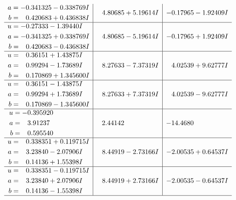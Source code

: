 \documentclass[1p]{elsarticle_modified}
\theoremstyle{definition}
\begin{document}
$$\begin{array}{c|c|c}
\begin{aligned}
a &= -0.341325 - 0.338769 I \\
b &= \phantom{-}0.420683 + 0.436838 I\end{aligned}
 & \phantom{-}4.80685 + 5.19614 I & -0.17965 - 1.92409 I \\ \hline\begin{aligned}
u &= -0.27333 - 1.39440 I \\
a &= -0.341325 + 0.338769 I \\
b &= \phantom{-}0.420683 - 0.436838 I\end{aligned}
 & \phantom{-}4.80685 - 5.19614 I & -0.17965 + 1.92409 I \\ \hline\begin{aligned}
u &= \phantom{-}0.36151 + 1.43875 I \\
a &= \phantom{-}0.99294 - 1.73689 I \\
b &= \phantom{-}0.170869 + 1.345600 I\end{aligned}
 & \phantom{-}8.27633 - 7.37319 I & \phantom{-}4.02539 + 9.62777 I \\ \hline\begin{aligned}
u &= \phantom{-}0.36151 - 1.43875 I \\
a &= \phantom{-}0.99294 + 1.73689 I \\
b &= \phantom{-}0.170869 - 1.345600 I\end{aligned}
 & \phantom{-}8.27633 + 7.37319 I & \phantom{-}4.02539 - 9.62777 I \\ \hline\begin{aligned}
u &= -0.395920\phantom{ +0.000000I} \\
a &= \phantom{-}3.91237\phantom{ +0.000000I} \\
b &= \phantom{-}0.595540\phantom{ +0.000000I}\end{aligned}
 & \phantom{-}2.44142\phantom{ +0.000000I} & -14.4680\phantom{ +0.000000I} \\ \hline\begin{aligned}
u &= \phantom{-}0.338351 + 0.119715 I \\
a &= \phantom{-}3.23840 - 2.07906 I \\
b &= \phantom{-}0.14136 + 1.55398 I\end{aligned}
 & \phantom{-}8.44919 - 2.73166 I & -2.00535 + 0.64537 I \\ \hline\begin{aligned}
u &= \phantom{-}0.338351 - 0.119715 I \\
a &= \phantom{-}3.23840 + 2.07906 I \\
b &= \phantom{-}0.14136 - 1.55398 I\end{aligned}
 & \phantom{-}8.44919 + 2.73166 I & -2.00535 - 0.64537 I\\
 \hline 
 \end{array}$$\newpage
\end{document}
